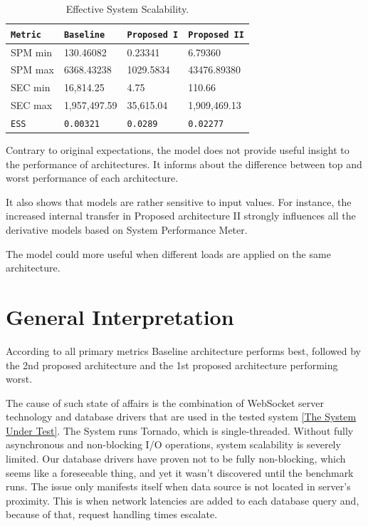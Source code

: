 \documentclass{uvamscse}
\begin{document}
\begin{table}[H]
\begin{center}
\begin{tabular}{llll}
  \texttt{Metric}               & \texttt{Baseline}   & \texttt{Proposed I}  & \texttt{Proposed II}  \\
  \hline
  SPM min                       & 130.46082           & 0.23341              & 6.79360                 \\
  SPM max                       & 6368.43238          & 1029.5834            & 43476.89380                 \\
  \hline
  SEC min                       & 16,814.25           & 4.75                 & 110.66         \\
  SEC max                       & 1,957,497.59        & 35,615.04            & 1,909,469.13         \\
  \hline
  \texttt{ESS}                   & \texttt{0.00321}     & \texttt{0.0289}      & \texttt{0.02277}
\end{tabular}
\end{center}
\caption{Effective System Scalability.}
\label{table:ess}
\end{table}

Contrary to original expectations, the model does not provide useful insight to the performance of architectures. It informs about the difference between top and worst performance of each architecture.

It also shows that models are rather sensitive to input values. For instance, the increased internal transfer in Proposed architecture II strongly influences all the derivative models based on System Performance Meter.

The model could more useful when different loads are applied on the same architecture.

\section{General Interpretation}

According to all primary metrics Baseline architecture performs best, followed by the 2nd proposed architecture and the 1st proposed architecture performing worst.

The cause of such state of affairs is the combination of WebSocket server technology and database drivers that are used in the tested system \ref{The System Under Test}. The System runs Tornado, which is single-threaded. Without fully asynchronous and non-blocking I/O operations, system scalability is severely limited. Our database drivers have proven not to be fully non-blocking, which seems like a foreseeable thing, and yet it wasn't discovered until the benchmark runs. The issue only manifests itself when data source is not located in server's proximity. This is when network latencies are added to each database query and, because of that, request handling times escalate.
\end{document}
